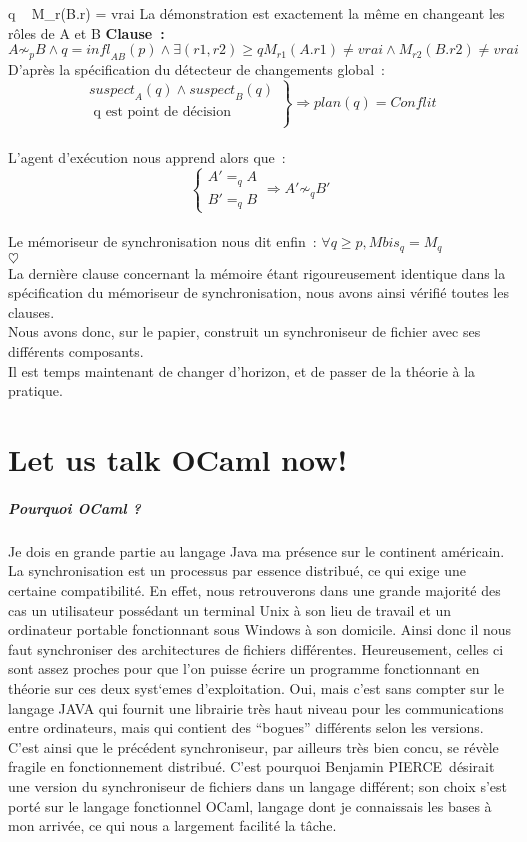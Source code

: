 \documentclass[11pt]{report}
\newcommand{\adv}{Benjamin PIERCE}
\newcommand{\sus}[1]{\ensuremath{\mathit{suspect}_{#1}}}
\newcommand{\clause}[2]{\textbf{Clause~:} $#1$\\
#2\\
$\heartsuit$\\}
\begin{document}
{{\geq q \mbox{\ } M_{r}(B.r) = vrai}
{La d\'emonstration est exactement la m\^eme en changeant les r\^oles de A et
  B}
\clause{A \not\sim_{p} B \wedge q = \mathit{infl}_{AB}(p) \wedge \exists 
(r1, r2) \geq q M_{r1}(A.r1) \neq vrai \wedge M_{r2}(B.r2) \neq vrai}
{D'apr\`es la sp\'ecification du d\'etecteur de changements global~:\\
\[
\left.
\begin{array}{l}
\sus{A}(q) \wedge \sus{B}(q)\\
\mbox{ q est point de d\'ecision}\\
\end{array}
\right\} \Rightarrow \mathit{plan}(q) = \mathit{Conflit}\]\\
L'agent d'ex\'ecution nous apprend alors que~:
\[
\left\{
\begin{array}{l}
A' =_{q} A\\
B' =_{q} B
\end{array} 
\right. \Rightarrow A' \not\sim_{q} B'
\]\\
Le m\'emoriseur de synchronisation nous dit enfin~:
$\forall q \geq p, \mathit{Mbis}_{q} = M_{q}$ 
}
La derni\`ere clause concernant la m\'emoire \'etant  rigoureusement 
identique dans la sp\'ecification du m\'emoriseur de synchronisation,
nous avons ainsi v\'erifi\'e toutes les clauses.\\
Nous avons donc, sur le papier, construit un synchroniseur de fichier 
avec ses diff\'erents composants.\\
Il est temps maintenant de changer d'horizon, et de passer de la th\'eorie \`a la 
pratique.
\chapter{Let us talk OCaml now!}
\paragraph{Pourquoi OCaml ?\\}
Je dois en grande partie au langage Java ma pr\'esence sur le continent 
am\'ericain. La synchronisation est un processus par essence distribu\'e,
ce qui exige une certaine compatibilit\'e. En effet, nous retrouverons dans une
grande majorit\'e des cas un utilisateur poss\'edant un terminal Unix 
\`a son lieu de travail et un ordinateur portable fonctionnant sous 
Windows \`a son domicile. Ainsi donc il nous faut synchroniser des
architectures de fichiers diff\'erentes.
Heureusement, celles ci sont assez proches pour que l'on puisse \'ecrire
un programme fonctionnant en th\'eorie sur ces deux syst`emes d'exploitation.
Oui, mais c'est sans compter sur le langage JAVA qui fournit une librairie
tr\`es haut niveau pour les communications entre ordinateurs, mais qui 
contient des ``bogues'' diff\'erents selon les versions.\\
C'est ainsi que le pr\'ec\'edent synchroniseur, par ailleurs tr\`es
bien concu, se r\'ev\`ele fragile en fonctionnement distribu\'e.
C'est pourquoi \adv\ d\'esirait une version du synchroniseur de fichiers
dans un langage diff\'erent; son choix s'est port\'e sur le langage 
fonctionnel OCaml, langage dont je connaissais les bases \`a mon arriv\'ee,
ce qui nous a largement facilit\'e la t\^ache.
}
\end{document}

